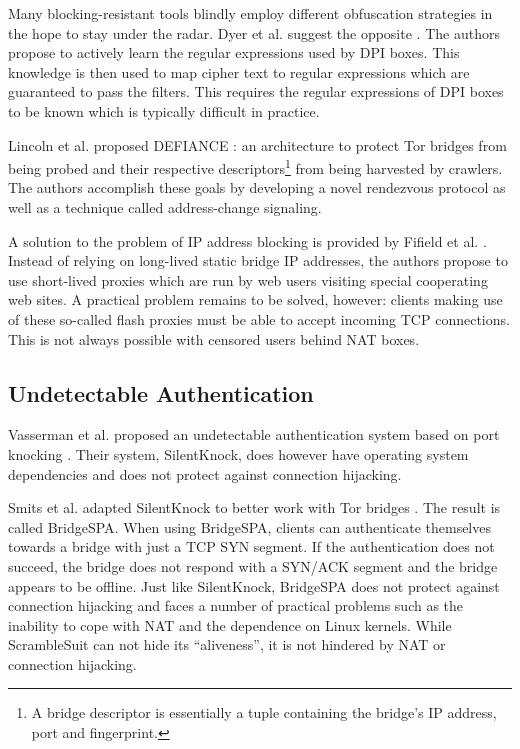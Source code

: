 \documentclass{sig-alternate}
\newcommand{\pt}{\textsf{ScrambleSuit}}
\numberwithin{enumi}{section}
\numberwithin{notesctr}{section}
\begin{document}
Many blocking-resistant tools blindly employ different obfuscation strategies in the hope to stay
under the radar. Dyer et al. suggest the opposite \cite{Dyer2012}. The authors propose to
actively learn the regular expressions used by DPI boxes. This knowledge is then used to map cipher
text to regular expressions which are guaranteed to pass the filters. This requires the regular
expressions of DPI boxes to be known which is typically difficult in practice.

Lincoln et al. proposed DEFIANCE \cite{Lincoln2012}: an architecture to protect Tor bridges from
being probed and their respective descriptors\footnote{A bridge descriptor is essentially a tuple
containing the bridge's IP address, port and fingerprint.} from being harvested by crawlers. The
authors accomplish these goals by developing a novel rendezvous protocol as well as a technique
called address-change signaling.

A solution to the problem of IP address blocking is provided by Fifield et al. \cite{Fifield2012}.
Instead of relying on long-lived static bridge IP addresses, the authors propose to use short-lived
proxies which are run by web users visiting special cooperating web sites. A practical problem
remains to be solved, however: clients making use of these so-called flash proxies must be able to
accept incoming TCP connections. This is not always possible with censored users behind NAT boxes.

\subsection{Undetectable Authentication}
Vasserman et al. proposed an undetectable authentication system based on port knocking
\cite{Vasserman2007}. Their system, SilentKnock, does however have operating system dependencies and
does not protect against connection hijacking.

Smits et al. adapted SilentKnock to better work with Tor bridges \cite{Smits2011}. The result is
called BridgeSPA. When using BridgeSPA, clients can authenticate themselves towards a bridge with
just a TCP SYN segment. If the authentication does not succeed, the bridge does not respond with a
SYN/ACK segment and the bridge appears to be offline. Just like SilentKnock, BridgeSPA does not
protect against connection hijacking and faces a number of practical problems such as the inability
to cope with NAT and the dependence on Linux kernels. While \pt{} can not hide its ``aliveness'', it
is not hindered by NAT or connection hijacking.
\end{document}
